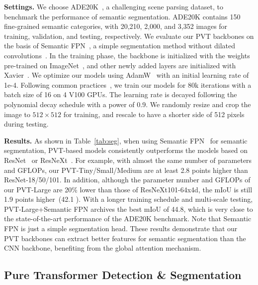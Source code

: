 \documentclass[10pt,twocolumn,letterpaper]{article}
\begin{document}
\noindent\textbf{Settings.}
We choose ADE20K~\cite{zhou2017scene}, a challenging scene parsing dataset, to benchmark the performance of semantic segmentation. ADE20K contains 150 fine-grained semantic categories, with 20,210, 2,000, and 3,352 images for training, validation, and testing, respectively. 
%
We evaluate our PVT backbones on the basis of Semantic FPN~\cite{kirillov2019panoptic}, a simple segmentation method without dilated convolutions~\cite{yu2015multi}.
In the training phase, the backbone is initialized with the weights pre-trained on ImageNet~\cite{deng2009imagenet}, and other newly added layers are initialized with Xavier~\cite{glorot2010understanding}. 
We optimize our models using AdamW~\cite{loshchilov2017decoupled} with an initial learning rate of 1e-4.
Following common practices~\cite{kirillov2019panoptic,chen2017deeplab}, we train our models for 80k iterations with a batch size of 16 on 4 V100 GPUs.
The learning rate is decayed following the polynomial decay schedule with a power of 0.9.
We randomly resize and crop the image to $512\times 512$ for training, and rescale to have a shorter side of 512 pixels during testing.


\noindent\textbf{Results.} 
As shown in Table~\ref{tab:seg}, when using Semantic FPN~\cite{kirillov2019panoptic} for semantic segmentation, PVT-based models consistently outperforms the models based on ResNet~\cite{he2016deep} or ResNeXt~\cite{xie2017aggregated}.
%
For example, with almost the same number of parameters and GFLOPs, our PVT-Tiny/Small/Medium are at least 2.8 points higher than ResNet-18/50/101. 
In addition, although the parameter number and GFLOPs of our PVT-Large are 20\% lower than those of ResNeXt101-64x4d,
%
the mIoU is still 1.9 points higher~(42.1 ).
With a longer training schedule and multi-scale testing, PVT-Large+Semantic FPN archives the best mIoU of 44.8, which is very close to the state-of-the-art performance of the ADE20K benchmark. Note that Semantic FPN is just a simple segmentation head.
%
These results demonstrate that our PVT backbones can extract better features for semantic segmentation than the CNN backbone, benefiting from the global attention mechanism.


\subsection{Pure Transformer Detection \& Segmentation}
\end{document}
